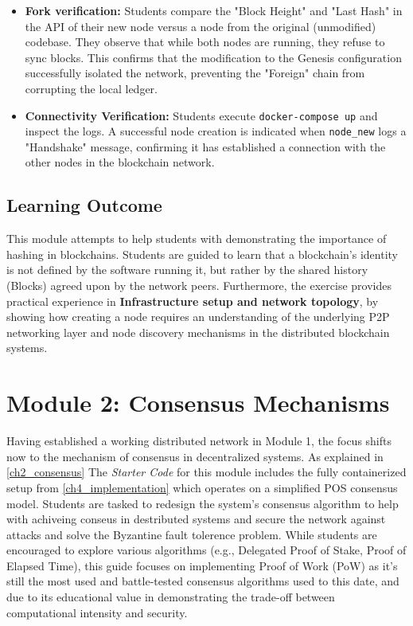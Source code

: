 \begin{itemize}
    \item \textbf{Fork verification:} Students compare the "Block Height" and "Last Hash" in the API of their new node versus a node from the original (unmodified) codebase. They observe that while both nodes are running, they refuse to sync blocks. This confirms that the modification to the Genesis configuration successfully isolated the network, preventing the "Foreign" chain from corrupting the local ledger.
    \item \textbf{Connectivity Verification:} Students execute \texttt{docker-compose up} and inspect the logs. A successful node creation is indicated when \texttt{node\_new} logs a "Handshake" message, confirming it has established a connection with the other nodes in the blockchain network.

\end{itemize}

\subsection{Learning Outcome}
This module attempts to help students with demonstrating the importance of hashing in blockchains. Students are guided to learn that a blockchain's identity is not defined by the software running it, but rather by the shared history (Blocks) agreed upon by the network peers. Furthermore, the exercise provides practical experience in \textbf{Infrastructure setup and network topology}, by showing how creating a node requires an understanding of the underlying P2P networking layer and node discovery mechanisms in the distributed blockchain systems.


\newpage

\section{Module 2: Consensus Mechanisms} \label{ch5_module2}

Having established a working distributed network in Module 1, the focus shifts now to the mechanism of consensus in decentralized systems. As explained in \ref{ch2_consensus} The \textit{Starter Code} for this module includes the fully containerized setup from \ref{ch4_implementation} which operates on a simplified POS consensus model. Students are tasked to redesign the system's consensus algorithm to help with achiveing conseus in destributed systems and secure the network against attacks and solve the Byzantine fault tolerence problem. While students are encouraged to explore various algorithms (e.g., Delegated Proof of Stake, Proof of Elapsed Time), this guide focuses on implementing Proof of Work (PoW) as it's still the most used and battle-tested consensus algorithms used to this date, and due to its educational value in demonstrating the trade-off between computational intensity and security.

